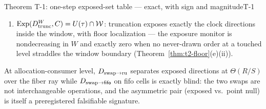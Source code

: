 \begin{preregthm}{Theorem T-1: one-step exposed-set table --- exact, with sign
and magnitude}{T-1}
\begin{enumerate}
$\Theta((\delta - h_a)^{+})$ --- a dead zone then an integer-lattice jump
(endpoint $a$ loses, later orders gain); splits with both endpoints beyond
the threshold are blind. The O-B point-null cell assignment belongs to the
fifo-trained cell, and the ru-cell row is certified only per instance.
\item $\Exp(\Dtrunc[W], \Ccons) = \Utau \cap \mathcal{W}$: truncation
exposes exactly the clock directions inside the window, with floor
localization --- the exposure monitor is nondecreasing in $W$ and exactly
zero when no never-drawn order at a touched level straddles the window
boundary (Theorem~\ref{thm:t2-floor}(e)(ii)).
\end{enumerate}
\end{preregthm}


\begin{corollary}
\label{cor:t3-asym}
At allocation-consumer level, $\Dswapru$ separates exposed directions at
$\Theta(R/S)$ over the fiber ray while $\Dswapfifo$ on fifo cells is exactly
blind: the two swaps are not interchangeable operations, and the asymmetric
pair (exposed vs.\ point null) is itself a preregistered falsifiable
signature.
\end{corollary}



